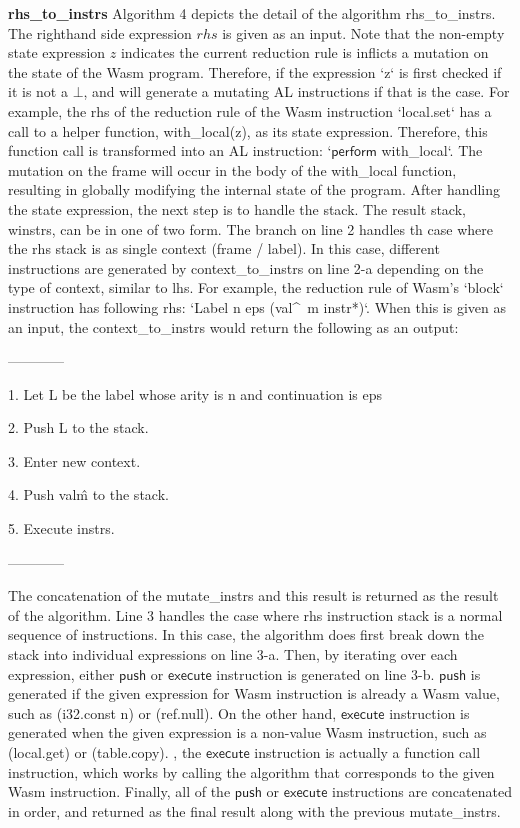 \textbf{rhs\_to\_instrs} Algorithm 4 depicts the detail of the algorithm rhs\_to\_instrs.
The righthand side expression $rhs$ is given as an input.
Note that the non-empty state expression $z$ indicates the current reduction rule is
inflicts a mutation on the state of the Wasm program. Therefore, if the expression `z`
is first checked if it is not a $\bot$, and will generate a mutating AL instructions if
that is the case. For example, the rhs of the reduction rule of the Wasm instruction
`local.set` has a call to a helper function, with\_local(z), as its state expression.
Therefore, this function call is transformed into an AL instruction: `$\mathsf{perform}$ with\_local`.
The mutation on the frame will occur in the body of the with\_local function, resulting in globally
modifying the internal state of the program. After handling the state expression, the next step is to
handle the stack. The result stack, winstrs, can be in one of two form. The branch on
line 2 handles th case where the rhs stack is as single context (frame / label). In this case,
different instructions are generated by context\_to\_instrs on line 2-a depending on the type of context,
similar to lhs. For example, the reduction rule of Wasm's `block` instruction has following rhs:
`Label n eps (val\^~m instr*)`. When this is given as an input, the context\_to\_instrs would return the
following as an output:

------------

1. Let L be the label whose arity is n and continuation is eps

2. Push L to the stack.

3. Enter new context.

4. Push val\^m to the stack.

5. Execute instrs.

------------

The concatenation of the mutate\_instrs and this result is returned as the result of the algorithm.
Line 3 handles the case where rhs instruction stack is a normal sequence of instructions. In this case,
the algorithm does first break down the stack into individual expressions on line 3-a. Then,
by iterating over each expression, either $\mathsf{push}$ or $\mathsf{execute}$ instruction is
generated on line 3-b. $\mathsf{push}$ is generated if the given expression for Wasm instruction is
already a Wasm value, such as (i32.const n) or (ref.null). On the other hand, $\mathsf{execute}$ instruction is generated
when the given expression is a non-value Wasm instruction, such as (local.get) or (table.copy).
, the $\mathsf{execute}$ instruction is actually a function call instruction,
which works by calling the algorithm that corresponds to the given Wasm instruction.
Finally, all of the $\mathsf{push}$ or $\mathsf{execute}$ instructions are concatenated in order, and
returned as the final result along with the previous mutate\_instrs.
